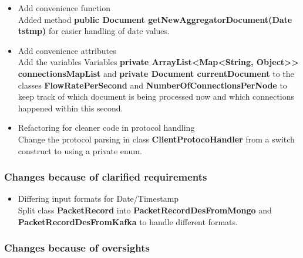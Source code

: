 \documentclass[oneside, english, final]{design}
\begin{document}
\begin{itemize}
  \item{Add convenience function}
    \\
    Added method \textsf{\textbf{public Document getNewAggregatorDocument(Date tstmp)}} for easier handling of date values.

    
  \item{Add convenience attributes}
    \\
    Add the variables Variables
    \textsf{\textbf{private ArrayList<Map<String, Object>> connectionsMapList}} and
    \textsf{\textbf{private Document currentDocument}} to the classes \textsf{\textbf{FlowRatePerSecond}} and \textsf{\textbf{NumberOfConnectionsPerNode}} to
    keep track of which document is being processed now and which connections happened within this second.


\item{Refactoring for cleaner code in protocol handling}
  \\
  Change the protocol parsing in class \textsf{\textbf{ClientProtocoHandler}} from a switch construct to using a private enum.

\end{itemize}

\subsubsection{Changes because of clarified requirements}
\begin{itemize}
\item{Differing input formats for Date/Timestamp}
  \\
  Split class \textsf{\textbf{PacketRecord}} into \textsf{\textbf{PacketRecordDesFromMongo}} and \textsf{\textbf{PacketRecordDesFromKafka}} to handle different formats.

\end{itemize}


\subsubsection{Changes because of oversights}
\end{document}
